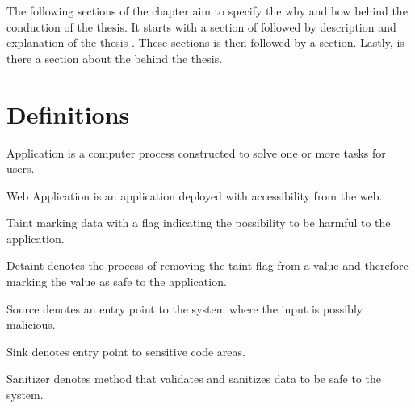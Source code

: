 The following sections of the chapter aim to specify the why and how behind the conduction of the thesis. It starts with a section of \textit{} followed by \textit{} description and explanation of the thesis \textit{}. These sections is then followed by a \textit{} section. Lastly, is there a section about the \textit{} behind the thesis.



\section{Definitions}
\label{Definitions}
\begin{definition}{Application}
    is a computer process constructed to solve one or more tasks for users.
    \\
\end{definition}

\begin{definition}{Web Application}
    is an application deployed with accessibility from the web.
    \\
\end{definition}

\begin{definition}{Taint}
    marking data with a flag indicating the possibility to be harmful to the application.
    \\
\end{definition}

\begin{definition}{Detaint}
    denotes the process of removing the taint flag from a value and therefore marking the value as safe to the application.
    \\
\end{definition}

\begin{definition}{Source}
    denotes an entry point to the system where the input is possibly malicious.
    \\
\end{definition}

\begin{definition}{Sink}
    denotes entry point to sensitive code areas.
    \\
\end{definition}

\begin{definition}{Sanitizer}
    denotes method that validates and sanitizes data to be safe to the system.
    \\
\end{definition}

